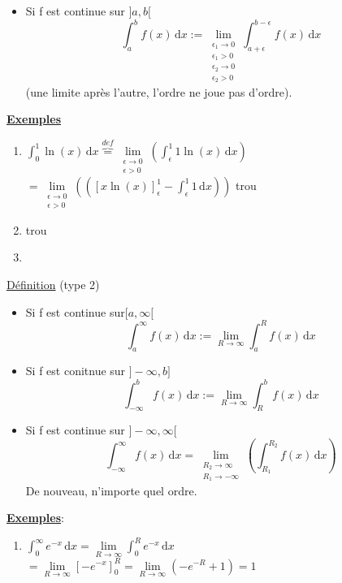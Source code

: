 \documentclass[12pt,a4paper]{article}
\newcommand{\limite}{\lim\limits_}
\newcommand{\llimite}[3]{\limite{\substack{#1 \\ #2}}\left(#3\right)}
\newcommand{\evid}[1]{\textbf{\underline{#1}}}
\newcommand{\Definition}{\underline{Définition} }
\newcommand{\intx}[3]{\ensuremath{\int_{#1}^{#2} #3 \, \mathrm dx}}
\begin{document}
{\begin{boite}
\begin{itemize}
		\item Si f est continue sur $]a,b[$
		\begin{equation}
			\intx{a}{b}{f(x)} :=\limite{\substack{\epsilon_1 \to 0 \\ \epsilon_1 > 0 \\ \epsilon_2 \to 0 \\ \epsilon_2 > 0}}\intx{a+\epsilon}{b-\epsilon}{f(x)}
		\end{equation}
		(une limite après l'autre, l'ordre ne joue pas d'ordre).
	\end{itemize}
\end{boite}
\evid{Exemples}
\begin{enumerate}
	\item $\intx{0}{1}{\ln(x)} \overbrace{=}^{def} \llimite{\epsilon \to 0}{\epsilon > 0}{\intx{\epsilon}{1}{1\ln(x)}}$\\
	$= \llimite{\epsilon \to 0}{\epsilon > 0}{([x\ln(x)]_\epsilon^1 - \intx{\epsilon}{1}{1})}$ {trou}
	\item {trou}
	\item 
\end{enumerate}
\begin{boite}
	\Definition (type 2)\\
	\begin{itemize}
		\item Si f est continue sur$[a,\infty[$
		\begin{equation}
			\intx{a}{\infty}{f(x)} := \limite{R \to \infty}\intx{a}{R}{f(x)}
		\end{equation}
		\item Si f est conitnue sur $]-\infty,b]$
		\begin{equation}
			\intx{-\infty}{b}{f(x)} := \limite{R \to \infty}\intx{R}{b}{f(x)}
		\end{equation}
		\item Si f est continue sur $]-\infty,\infty[$
		\begin{equation}
			\intx{-\infty}{\infty}{f(x)} = \llimite{R_2 \to \infty}{R_1 \to -\infty}{\intx{R_1}{R_2}{f(x)}}
		\end{equation}
		De nouveau, n'importe quel ordre.
	\end{itemize}
\end{boite}
\evid{Exemples}:
\begin{enumerate}
	\item $\intx{0}{\infty}{e^{-x}} = \limite{R \to \infty}\intx{0}{R}{e^{-x}}$\\
	$= \limite{R\to \infty}[-e^{-x}]_0^R = \limite{R\to \infty}(-e^{-R} + 1) = 1$

\end{enumerate}}
\end{document}

